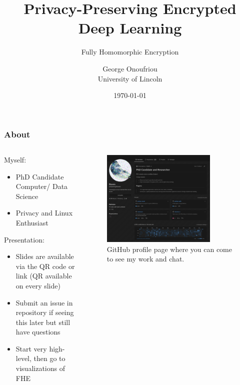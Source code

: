 \documentclass[aspectratio=169]{beamer}
\title{Privacy-Preserving Encrypted Deep Learning}
\subtitle{Fully Homomorphic Encryption}
\author{George Onoufriou\\University of Lincoln}
\date{\today}
\begin{document}

  \frame{\titlepage}

  \begin{frame}
    \frametitle{About}
    \begin{columns}
      \begin{column}{0.5\textwidth}
        Myself:
        \begin{itemize}
          \item PhD Candidate Computer/ Data Science
          \item Privacy and Linux Enthusiast
        \end{itemize}
        Presentation:
        \begin{itemize}
          \item Slides are available via the QR code or link (QR available on every slide)
          \item Submit an issue in repository if seeing this later but still have questions
          \item Start very high-level, then go to visualizations of FHE
        \end{itemize}
      \end{column}
      \begin{column}{0.5\textwidth}
        \begin{figure}[th!]
          \centering
          \includegraphics[width=0.8\textwidth]{gh.png}
          \caption{GitHub profile page where you can come to see my work and chat. \autocite{repository}}
          \label{fig:gh}
        \end{figure}
      \end{column}
    \end{columns}
  \end{frame}
\end{document}

